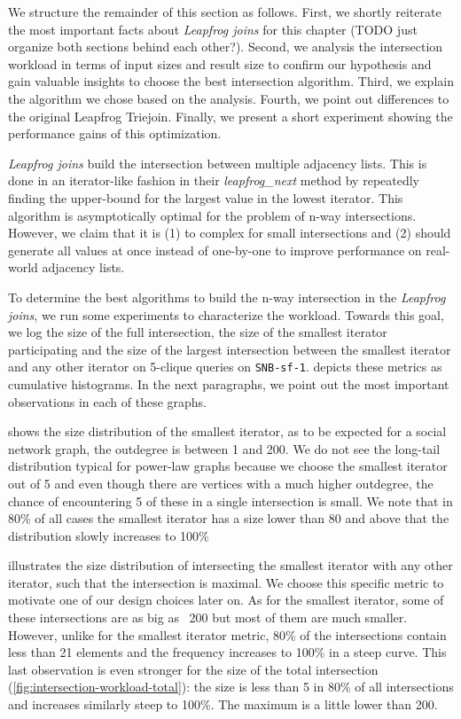 We structure the remainder of this section as follows.
First, we shortly reiterate the most important facts about \textit{Leapfrog joins} for this chapter (TODO just organize both sections
behind each other?).
Second, we analysis the intersection workload in terms of input sizes and result size to confirm our hypothesis
and gain valuable insights to choose the best intersection algorithm.
Third, we explain the algorithm we chose based on the analysis.
Fourth, we point out differences to the original Leapfrog Triejoin.
Finally, we present a short experiment showing the performance gains of this optimization.

\textit{Leapfrog joins} build the intersection between multiple adjacency lists.
This is done in an iterator-like fashion in their \textit{leapfrog\_next} method by repeatedly finding the upper-bound for the largest
value in the lowest iterator.
This algorithm is asymptotically optimal for the problem of n-way intersections.
However, we claim that it is (1) to complex for small intersections and (2) should generate all values at once instead of one-by-one to
improve performance on real-world adjacency lists.

To determine the best algorithms to build the n-way intersection in the \textit{Leapfrog joins},
we run some experiments to characterize the workload.
Towards this goal, we log the size of the full intersection, the size of the smallest iterator participating
and the size of the largest intersection between the smallest iterator and any other iterator on 5-clique queries on \texttt{SNB-sf-1}.
 depicts these metrics as cumulative histograms.
In the next paragraphs, we point out the most important observations in each of these graphs.

 shows the size distribution of the smallest iterator, as to be expected for a social network
graph, the outdegree is between 1 and 200.
We do not see the long-tail distribution typical for power-law graphs because we choose the smallest iterator out of 5 and even
though there are vertices with a much higher outdegree, the chance of encountering 5 of these in a single intersection is small.
We note that in 80\% of all cases the smallest iterator has a size lower than 80 and above that the distribution slowly increases to 100\%

 illustrates the size distribution of intersecting the smallest iterator with any other
iterator, such that the intersection is maximal.
We choose this specific metric to motivate one of our design choices later on.
As for the smallest iterator, some of these intersections are as big as ~200 but most of them are much smaller.
However, unlike for the smallest iterator metric, 80\% of the intersections contain less than 21  elements and the frequency increases to
100\% in a steep curve.
This last observation is even stronger for the size of the total intersection (\cref{fig:intersection-workload-total}):
the size is less than 5 in 80\% of all intersections and increases similarly steep to 100\%.
The maximum is a little lower than 200.

